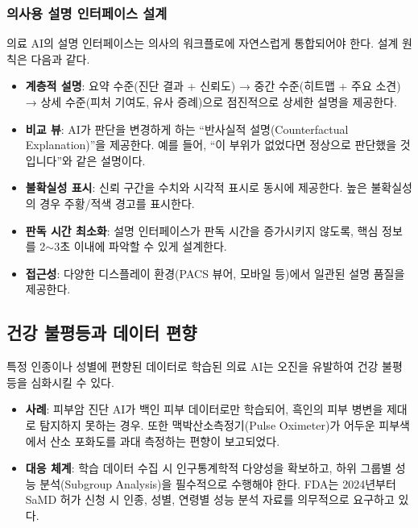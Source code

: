 \subsubsection{의사용 설명 인터페이스 설계}

의료 AI의 설명 인터페이스는 의사의 워크플로에 자연스럽게 통합되어야 한다. 설계 원칙은 다음과 같다.

\begin{itemize}
 \item \textbf{계층적 설명}: 요약 수준(진단 결과 + 신뢰도) → 중간 수준(히트맵 + 주요 소견) → 상세 수준(피처 기여도, 유사 증례)으로 점진적으로 상세한 설명을 제공한다.
 \item \textbf{비교 뷰}: AI가 판단을 변경하게 하는 ``반사실적 설명(Counterfactual Explanation)''을 제공한다. 예를 들어, ``이 부위가 없었다면 정상으로 판단했을 것입니다''와 같은 설명이다.
 \item \textbf{불확실성 표시}: 신뢰 구간을 수치와 시각적 표시로 동시에 제공한다. 높은 불확실성의 경우 주황/적색 경고를 표시한다.
 \item \textbf{판독 시간 최소화}: 설명 인터페이스가 판독 시간을 증가시키지 않도록, 핵심 정보를 2$\sim$3초 이내에 파악할 수 있게 설계한다.
 \item \textbf{접근성}: 다양한 디스플레이 환경(PACS 뷰어, 모바일 등)에서 일관된 설명 품질을 제공한다.
\end{itemize}

\subsection{건강 불평등과 데이터 편향}
\label{sec:16.2.2}

특정 인종이나 성별에 편향된 데이터로 학습된 의료 AI는 오진을 유발하여 건강 불평등을 심화시킬 수 있다.

\begin{itemize}
 \item \textbf{사례}: 피부암 진단 AI가 백인 피부 데이터로만 학습되어, 흑인의 피부 병변을 제대로 탐지하지 못하는 경우. 또한 맥박산소측정기(Pulse Oximeter)가 어두운 피부색에서 산소 포화도를 과대 측정하는 편향이 보고되었다.
 \item \textbf{대응 체계}: 학습 데이터 수집 시 인구통계학적 다양성을 확보하고, 하위 그룹별 성능 분석(Subgroup Analysis)을 필수적으로 수행해야 한다. FDA는 2024년부터 SaMD 허가 신청 시 인종, 성별, 연령별 성능 분석 자료를 의무적으로 요구하고 있다.
\end{itemize}

